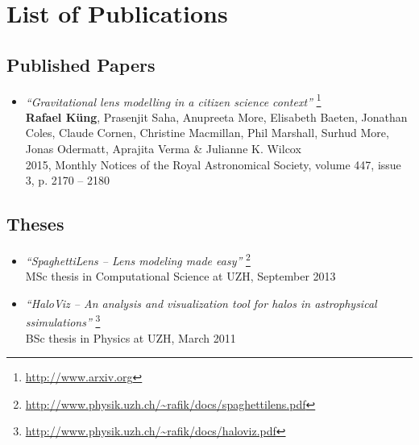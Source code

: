 \documentclass[12pt]{article}
\begin{document}
\pagestyle{empty}

\section*{List of Publications}

\subsection{Published Papers}

\begin{itemize}
\item
  \emph{``Gravitational lens modelling in a citizen science context''}
  \footnote{\url{http://www.arxiv.org}}\\
    {\bf Rafael Küng},
    Prasenjit Saha,
    Anupreeta More,
    Elisabeth Baeten,
    Jonathan Coles,
    Claude Cornen,
    Christine Macmillan,
    Phil Marshall,
    Surhud More,
    Jonas Odermatt,
    Aprajita Verma \&
    Julianne K. Wilcox\\    
    {\small
		2015, Monthly Notices of the Royal Astronomical Society, volume 447, issue 3, p. 2170 -- 2180
  	}

\end{itemize}


%


\subsection{Theses}

\begin{itemize}
  \item
    \emph{``SpaghettiLens -- Lens modeling made easy''}
    \footnote{\url{http://www.physik.uzh.ch/~rafik/docs/spaghettilens.pdf}}\\
    MSc thesis in Computational Science at UZH, September 2013
  \item
    \emph{``HaloViz --  An analysis and visualization tool for halos in astrophysical \\ ssimulations''}
    \footnote{\url{http://www.physik.uzh.ch/~rafik/docs/haloviz.pdf}}\\
     BSc thesis in Physics at UZH, March 2011
\end{itemize}
\end{document}

